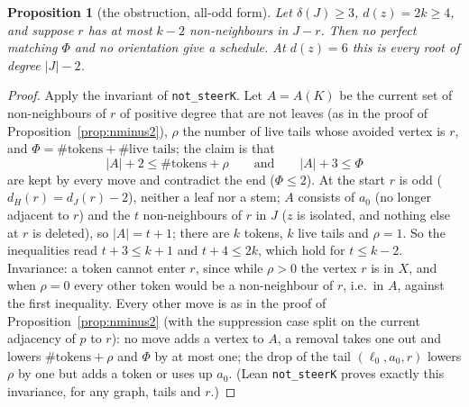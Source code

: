 \documentclass[11pt]{amsart}
\newtheorem{proposition}[theorem]{Proposition}
\theoremstyle{definition}
\newcommand{\lean}[1]{\quad{\footnotesize[Lean: \texttt{#1}]}}
\begin{document}
\begin{proposition}[the obstruction, all-odd form]\label{prop:aoddobs}
Let $\delta(J)\ge3$, $d(z)=2k\ge4$, and suppose $r$ has at most $k-2$ non-neighbours in $J-r$.
Then no perfect matching $\Phi$ and no orientation give a schedule. At $d(z)=6$ this is every root
of degree $|J|-2$.\lean{not\_steerK (abstract form)}
\end{proposition}

\begin{proof}
Apply the invariant of \texttt{not\_steerK}. Let $A=A(K)$ be the current set of non-neighbours of
$r$ of positive degree that are not leaves (as in the proof of Proposition~\ref{prop:nminus2}), $\rho$
the number of live tails whose avoided vertex is $r$, and
$\Phi=\#\text{tokens}+\#\text{live tails}$; the claim is that
\[|A|+2\le\#\text{tokens}+\rho\qquad\text{and}\qquad|A|+3\le\Phi\]
are kept by every move and contradict the end ($\Phi\le2$). At the start $r$ is odd ($d_H(r)=d_J(r)-2$),
neither a leaf nor a stem; $A$ consists of $a_0$ (no longer adjacent to $r$) and the $t$
non-neighbours of $r$ in $J$ ($z$ is isolated, and nothing else at $r$ is deleted), so $|A|=t+1$;
there are $k$ tokens, $k$ live tails and $\rho=1$. So the inequalities read $t+3\le k+1$ and $t+4\le2k$,
which hold for $t\le k-2$. Invariance: a token cannot enter $r$, since while $\rho>0$ the vertex $r$ is
in $X$, and when $\rho=0$ every other token would be a non-neighbour of $r$, i.e.\ in $A$, against the
first inequality. Every other move is as in the proof of Proposition~\ref{prop:nminus2} (with the
suppression case split on the current adjacency of $p$ to $r$): no move adds a vertex to $A$, a
removal takes one out and lowers $\#\text{tokens}+\rho$ and $\Phi$ by at most one; the drop of the
tail $(\ell_0,a_0,r)$ lowers $\rho$ by one but adds a token or uses up $a_0$. (Lean
\texttt{not\_steerK} proves exactly this invariance, for any graph, tails and $r$.)
\end{proof}
\end{document}
